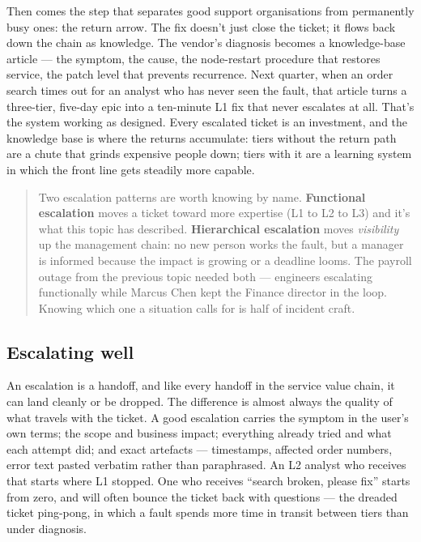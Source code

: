 Then comes the step that separates good support organisations from permanently busy ones: the return arrow. The fix doesn't just close the ticket; it flows back down the chain as knowledge. The vendor's diagnosis becomes a knowledge-base article — the symptom, the cause, the node-restart procedure that restores service, the patch level that prevents recurrence. Next quarter, when an order search times out for an analyst who has never seen the fault, that article turns a three-tier, five-day epic into a ten-minute L1 fix that never escalates at all. That's the system working as designed. Every escalated ticket is an investment, and the knowledge base is where the returns accumulate: tiers without the return path are a chute that grinds expensive people down; tiers with it are a learning system in which the front line gets steadily more capable.



\begin{quote}\small
Two escalation patterns are worth knowing by name. \textbf{Functional escalation} moves a ticket toward more expertise (L1 to L2 to L3) and it's what this topic has described. \textbf{Hierarchical escalation} moves \emph{visibility} up the management chain: no new person works the fault, but a manager is informed because the impact is growing or a deadline looms. The payroll outage from the previous topic needed both — engineers escalating functionally while Marcus Chen kept the Finance director in the loop. Knowing which one a situation calls for is half of incident craft.
\end{quote}



\subsection{Escalating well}


An escalation is a handoff, and like every handoff in the service value chain, it can land cleanly or be dropped. The difference is almost always the quality of what travels with the ticket. A good escalation carries the symptom in the user's own terms; the scope and business impact; everything already tried and what each attempt did; and exact artefacts — timestamps, affected order numbers, error text pasted verbatim rather than paraphrased. An L2 analyst who receives that starts where L1 stopped. One who receives ``search broken, please fix'' starts from zero, and will often bounce the ticket back with questions — the dreaded ticket ping-pong, in which a fault spends more time in transit between tiers than under diagnosis.


